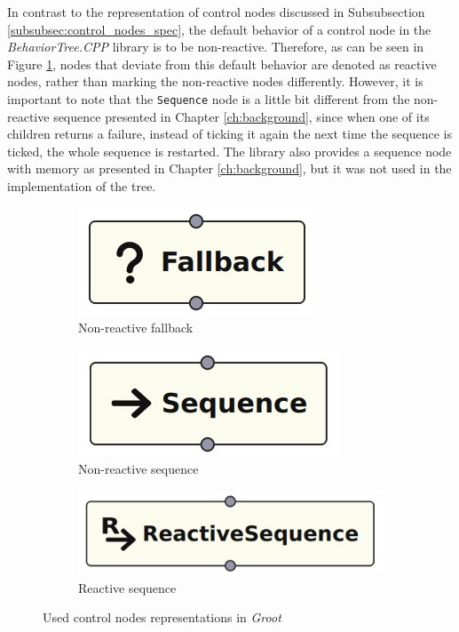 In contrast to the representation of control nodes discussed in Subsubsection \ref{subsubsec:control_nodes_spec}, the default behavior of a control node in the \textit{BehaviorTree.CPP} library is to be non-reactive. Therefore, as can be seen in Figure \ref{fig:control_nodes_impl}, nodes that deviate from this default behavior are denoted as reactive nodes, rather than marking the non-reactive nodes differently. However, it is important to note that the \texttt{Sequence} node is a little bit different from the non-reactive sequence presented in Chapter \ref{ch:background}, since when one of its children returns a failure, instead of ticking it again the next time the sequence is ticked, the whole sequence is restarted. The library also provides a sequence node with memory as presented in Chapter \ref{ch:background}, but it was not used in the implementation of the tree.

\begin{figure}[!h]
    \centering
    \begin{subfigure}[b]{.32\linewidth}
        \centering
        \includegraphics[width=0.52\linewidth]{chapters/development/images/FallbackNode.png}
        \caption{Non-reactive fallback}
    \end{subfigure}
    \hfill
    \begin{subfigure}[b]{.32\linewidth}
        \centering
        \includegraphics[width=0.57\linewidth]{chapters/development/images/SequenceNode.png}
        \caption{Non-reactive sequence}
    \end{subfigure}
    \hfill
    \begin{subfigure}[b]{.32\linewidth}
        \centering
        \includegraphics[width=0.8\linewidth]{chapters/development/images/ReactiveSequenceNode.png}
        \caption{Reactive sequence}
    \end{subfigure}
    \caption{Used control nodes representations in \textit{Groot}}
    \label{fig:control_nodes_impl}
\end{figure}

